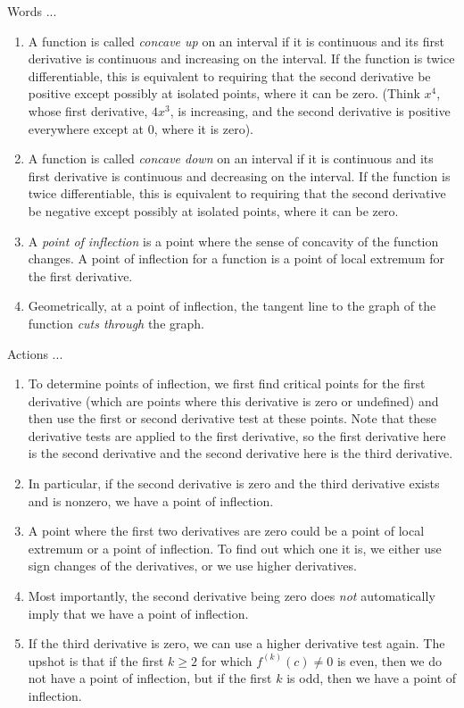 \documentclass[10pt]{amsart}
\begin{document}
Words ...

\begin{enumerate}
\item A function is called {\em concave up} on an interval if it is
  continuous and its first derivative is continuous and increasing on
  the interval. If the function is twice differentiable, this is
  equivalent to requiring that the second derivative be positive
  except possibly at isolated points, where it can be zero. (Think
  $x^4$, whose first derivative, $4x^3$, is increasing, and the second
  derivative is positive everywhere except at $0$, where it is zero).
\item A function is called {\em concave down} on an interval if it is
  continuous and its first derivative is continuous and decreasing on
  the interval. If the function is twice differentiable, this is
  equivalent to requiring that the second derivative be negative
  except possibly at isolated points, where it can be zero.
\item A {\em point of inflection} is a point where the sense of
  concavity of the function changes. A point of inflection for a
  function is a point of local extremum for the first derivative.
\item Geometrically, at a point of inflection, the tangent line to the
  graph of the function {\em cuts through} the graph.
\end{enumerate}

Actions ...

\begin{enumerate}

\item To determine points of inflection, we first find critical points
  for the first derivative (which are points where this derivative is
  zero or undefined) and then use the first or second derivative test
  at these points. Note that these derivative tests are applied to
  the first derivative, so the first derivative here is the second
  derivative and the second derivative here is the third derivative.
\item In particular, if the second derivative is zero and the third
  derivative exists and is nonzero, we have a point of inflection.
\item A point where the first two derivatives are zero could be a
  point of local extremum or a point of inflection. To find out which
  one it is, we either use sign changes of the derivatives, or we use
  higher derivatives.
\item Most importantly, the second derivative being zero does {\em
  not} automatically imply that we have a point of inflection.
\item If the third derivative is zero, we can use a higher derivative
  test again. The upshot is that if the first $k \ge 2$ for which
  $f^{(k)}(c) \ne 0$ is even, then we do not have a point of
  inflection, but if the first $k$ is odd, then we have a point of
  inflection.
\end{enumerate}
\end{document}
